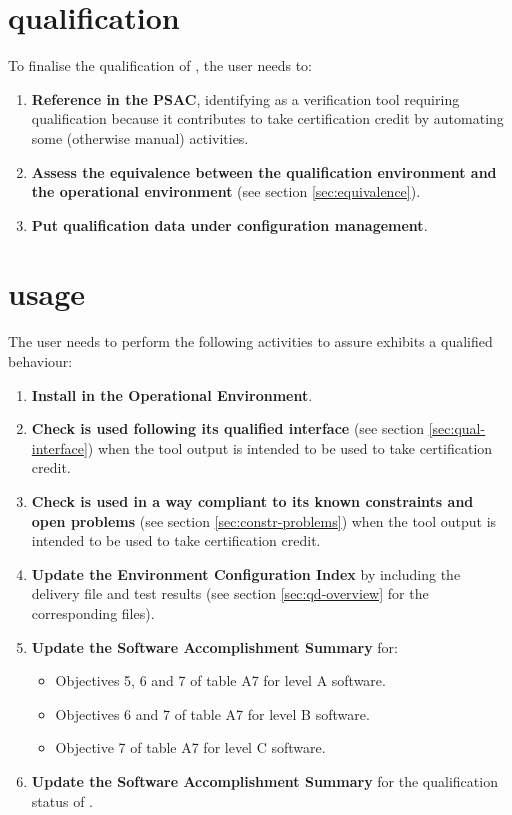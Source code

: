 \documentclass {report}
\begin{document}
\section{\xcov qualification}
To finalise the qualification of \xcov, the user needs to:
\begin{enumerate}
\item \textbf{Reference \xcov in the PSAC}, identifying \xcov as a verification tool requiring qualification because it contributes to take certification credit by automating some (otherwise manual) activities.
\item \textbf{Assess the equivalence between the qualification environment and the operational environment} (see section \ref{sec:equivalence}).
\item \textbf{Put qualification data under configuration management}.
\end{enumerate}

\section{\xcov usage}
The user needs to perform the following activities to assure \xcov exhibits a qualified behaviour:
\begin{enumerate}
\item \textbf{Install \xcov in the Operational Environment}.
\item \textbf{Check \xcov is used following its qualified interface} (see section \ref{sec:qual-interface}) when the tool output is intended to be used to take certification credit.
\item \textbf{Check \xcov is used in a way compliant to its known constraints and open problems} (see section \ref{sec:constr-problems}) when the tool output is intended to be used to take certification credit.
\item \textbf{Update the Environment Configuration Index} by including the delivery file and test results (see section \ref{sec:qd-overview} for the corresponding files).
\item \textbf{Update the Software Accomplishment Summary} for:
\begin{itemize}
\item Objectives 5, 6 and 7 of table A7 for level A software.
\item Objectives 6 and 7 of table A7 for level B software.
\item Objective 7 of table A7 for level C software.
\end{itemize}
\item \textbf{Update the Software Accomplishment Summary} for the qualification status of \xcov.
\end{enumerate}
\end{document}
